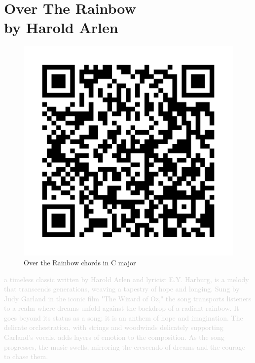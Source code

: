 \chapter[Over The Rainbow]{Over The Rainbow\\[1ex]\large{by Harold Arlen}}

\begin{figure}
\includegraphics[width=1\linewidth]{QR_Codes/QR_OverTheRainbow_Chords.png}\\
Over the Rainbow chords in C major
\end{figure}

\textcolor{lightgray}{a timeless classic written by Harold Arlen and lyricist E.Y. Harburg, is a melody that transcends generations, weaving a tapestry of hope and longing. Sung by Judy Garland in the iconic film "The Wizard of Oz," the song transports listeners to a realm where dreams unfold against the backdrop of a radiant rainbow.
It goes beyond its status as a song; it is an anthem of hope and imagination. The delicate orchestration, with strings and woodwinds delicately supporting Garland's vocals, adds layers of emotion to the composition. As the song progresses, the music swells, mirroring the crescendo of dreams and the courage to chase them.}\\
